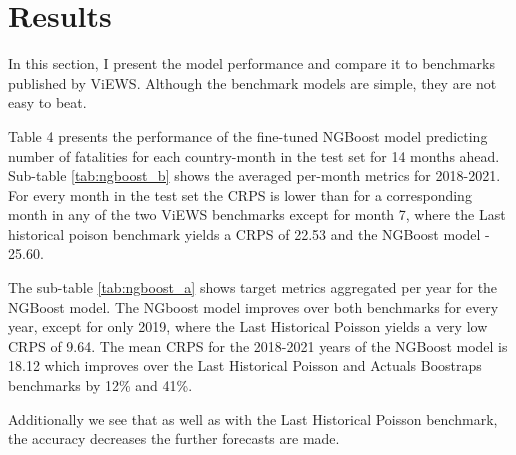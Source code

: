 \documentclass[runningheads]{llncs}
\begin{document}
    \section{Results}
    \label{section_results}

    In this section, I present the model performance and compare it to benchmarks published by ViEWS. Although the benchmark models are simple, they are not easy to beat.

    Table 4 presents the performance of the fine-tuned NGBoost model predicting number of fatalities for each country-month in the test set for 14 months ahead.
    Sub-table \ref{tab:ngboost_b} shows the averaged per-month metrics for 2018-2021.
    For every month in the test set the CRPS is lower than for a corresponding month in any of the two ViEWS benchmarks except for month 7, where the Last historical poison benchmark yields a CRPS of 22.53 and the NGBoost model - 25.60.

    The sub-table \ref{tab:ngboost_a} shows target metrics aggregated per year for the NGBoost model.
    The NGboost model improves over both benchmarks for every year, except for only 2019, where the Last Historical Poisson yields a very low CRPS of 9.64.
    The mean CRPS for the 2018-2021 years of the NGBoost model is 18.12 which improves over the Last Historical Poisson and Actuals Boostraps benchmarks by 12\% and 41\%.

    Additionally we see that as well as with the Last Historical Poisson benchmark, the accuracy decreases the further forecasts are made.
\end{document}
